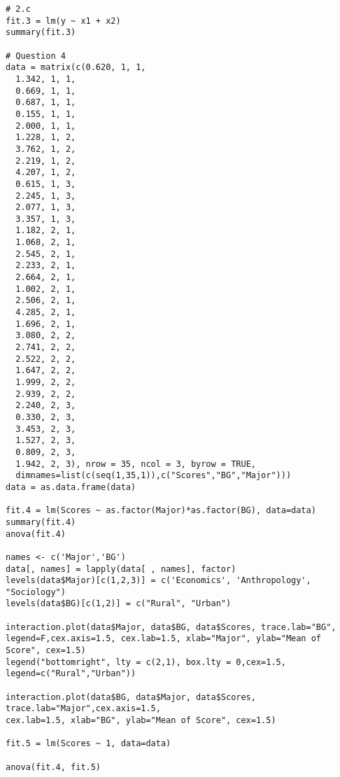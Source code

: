 \documentclass[a4paper, 11pt]{article}
\begin{document}
\begin{verbatim}
# 2.c
fit.3 = lm(y ~ x1 + x2)
summary(fit.3)

# Question 4
data = matrix(c(0.620, 1, 1,
  1.342, 1, 1,
  0.669, 1, 1,
  0.687, 1, 1,
  0.155, 1, 1,
  2.000, 1, 1,
  1.228, 1, 2,
  3.762, 1, 2,
  2.219, 1, 2,
  4.207, 1, 2,
  0.615, 1, 3,
  2.245, 1, 3,
  2.077, 1, 3,
  3.357, 1, 3,
  1.182, 2, 1,
  1.068, 2, 1,
  2.545, 2, 1,
  2.233, 2, 1, 
  2.664, 2, 1, 
  1.002, 2, 1, 
  2.506, 2, 1,
  4.285, 2, 1,
  1.696, 2, 1,
  3.080, 2, 2, 
  2.741, 2, 2,
  2.522, 2, 2,
  1.647, 2, 2,
  1.999, 2, 2,
  2.939, 2, 2,
  2.240, 2, 3,
  0.330, 2, 3,
  3.453, 2, 3,
  1.527, 2, 3,
  0.809, 2, 3,
  1.942, 2, 3), nrow = 35, ncol = 3, byrow = TRUE,
  dimnames=list(c(seq(1,35,1)),c("Scores","BG","Major")))
data = as.data.frame(data)  

fit.4 = lm(Scores ~ as.factor(Major)*as.factor(BG), data=data)
summary(fit.4)
anova(fit.4)

names <- c('Major','BG')
data[, names] = lapply(data[ , names], factor)
levels(data$Major)[c(1,2,3)] = c('Economics', 'Anthropology', "Sociology")
levels(data$BG)[c(1,2)] = c("Rural", "Urban")

interaction.plot(data$Major, data$BG, data$Scores, trace.lab="BG",
legend=F,cex.axis=1.5, cex.lab=1.5, xlab="Major", ylab="Mean of Score", cex=1.5)
legend("bottomright", lty = c(2,1), box.lty = 0,cex=1.5, legend=c("Rural","Urban"))

interaction.plot(data$BG, data$Major, data$Scores, trace.lab="Major",cex.axis=1.5, 
cex.lab=1.5, xlab="BG", ylab="Mean of Score", cex=1.5)

fit.5 = lm(Scores ~ 1, data=data)

anova(fit.4, fit.5)

\end{verbatim}
\end{document}
